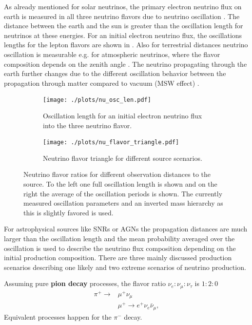 As already mentioned for solar neutrinos, the primary electron neutrino flux on earth is measured in all three neutrino flavors due to neutrino oscillation \cite{SNO01Oscillation}.
The distance between the earth and the sun is greater than the oscillation length for neutrinos at these energies.
For an initial electron neutrino flux, the oscillations lengths for the lepton flavors are shown in .
Also for terrestrial distances neutrino oscillation is measurable e.g. for atmospheric neutrinos, where the flavor composition depends on the zenith angle \cite{SK98Oscillation}.
The neutrino propagating through the earth further changes due to the different oscillation behavior between the propagation through matter compared to vacuum (MSW effect) \cite{Mikheyev85, Wolfenstein79}.
\begin{figure}
    \centering
    \begin{subfigure}[t]{0.47\textwidth}
        \centering
        \texttt{[image: ./plots/nu\_osc\_len.pdf]}
        \caption{Oscillation length for an initial electron neutrino flux into the three neutrino flavor.}
        \label{fig:nu_osc_len}
    \end{subfigure}
    \hfill
    \begin{subfigure}[t]{0.47\textwidth}
        \centering
        \texttt{[image: ./plots/nu\_flavor\_triangle.pdf]}
        \caption{Neutrino flavor triangle for different source scenarios.}
        \label{fig:nu_flavor_trangle}
    \end{subfigure}
    \caption{Neutrino flavor ratios for different observation distances to the source. To the left one full oscillation length is shown and on the right the average of the oscillation periods is shown. The currently measured oscillation parameters \cite{PDG20} and  an inverted mass hierarchy as this is slightly favored is used.}
    \label{fig:nu_osc}
\end{figure}

For astrophysical sources like SNRs or AGNs the propagation distances are much larger than the oscillation length and the mean probability averaged over the oscillation is used to describe the neutrino flux composition depending on the initial production composition.
There are three mainly discussed production scenarios describing one likely and two extreme scenarios of neutrino production.

Assuming pure \textbf{pion decay} processes, the flavor ratio $\nu_e : \nu_{\mu} : \nu_{\tau}$ is $1:2:0$
\begin{align}
    \pi^+ \to &\mu^+ \nu_\mu \\
    &\mu^+ \to e^+ \nu_e \bar{\nu}_{\mu} ,
\end{align}
Equivalent processes happen for the $\pi^-$ decay.

